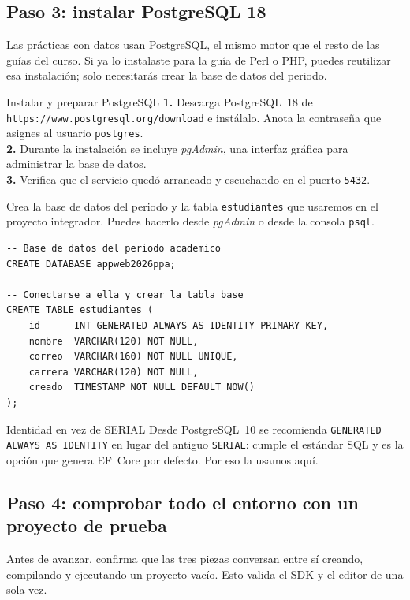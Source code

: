 \documentclass[11pt]{article}
\begin{document}
\subsection{Paso 3: instalar PostgreSQL 18}
Las prácticas con datos usan PostgreSQL, el mismo motor que el resto de las guías del curso. Si ya lo instalaste para la guía de Perl o PHP, puedes reutilizar esa instalación; solo necesitarás crear la base de datos del periodo.

\begin{cajavscode}{Instalar y preparar PostgreSQL}
\textbf{1.} Descarga PostgreSQL~18 de \texttt{https://www.postgresql.org/download} e instálalo. Anota la contraseña que asignes al usuario \texttt{postgres}.\\
\textbf{2.} Durante la instalación se incluye \emph{pgAdmin}, una interfaz gráfica para administrar la base de datos.\\
\textbf{3.} Verifica que el servicio quedó arrancado y escuchando en el puerto \texttt{5432}.
\end{cajavscode}
\vspace{2pt}
Crea la base de datos del periodo y la tabla \texttt{estudiantes} que usaremos en el proyecto integrador. Puedes hacerlo desde \emph{pgAdmin} o desde la consola \texttt{psql}.

\begin{cajacodigo}
\begin{lstlisting}[style=sql]
-- Base de datos del periodo academico
CREATE DATABASE appweb2026ppa;

-- Conectarse a ella y crear la tabla base
CREATE TABLE estudiantes (
    id      INT GENERATED ALWAYS AS IDENTITY PRIMARY KEY,
    nombre  VARCHAR(120) NOT NULL,
    correo  VARCHAR(160) NOT NULL UNIQUE,
    carrera VARCHAR(120) NOT NULL,
    creado  TIMESTAMP NOT NULL DEFAULT NOW()
);
\end{lstlisting}
\end{cajacodigo}
\vspace{2pt}
\begin{cajatip}{Identidad en vez de SERIAL}
Desde PostgreSQL~10 se recomienda \texttt{GENERATED ALWAYS AS IDENTITY} en lugar del antiguo \texttt{SERIAL}: cumple el estándar SQL y es la opción que genera EF~Core por defecto. Por eso la usamos aquí.\par
\end{cajatip}

\subsection{Paso 4: comprobar todo el entorno con un proyecto de prueba}
Antes de avanzar, confirma que las tres piezas conversan entre sí creando, compilando y ejecutando un proyecto vacío. Esto valida el SDK y el editor de una sola vez.
\end{document}
